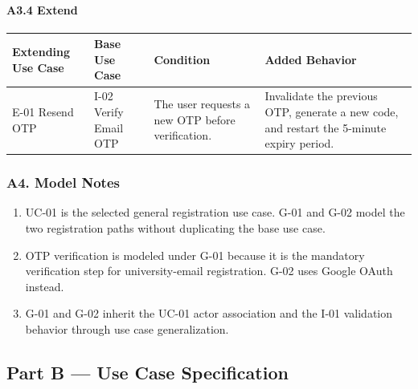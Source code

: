 \documentclass[12pt]{article}
\renewcommand{\baselinestretch}{1.5}
\begin{document}
\hypertarget{sec:a3-4-extend}{}
\paragraph*{A3.4 Extend}
\par\medskip

\begingroup
\small
\renewcommand{\baselinestretch}{1.0}\selectfont
\renewcommand{\arraystretch}{1.15}
\setlength{\tabcolsep}{6pt}
\begin{longtable}{|>{\raggedright\arraybackslash}p{}|>{\raggedright\arraybackslash}p{}|>{\raggedright\arraybackslash}p{}|>{\raggedright\arraybackslash}p{}|}
\hline
\textbf{Extending Use Case} & \textbf{Base Use Case} & \textbf{Condition} & \textbf{Added Behavior} \\ \hline
\endhead
E-01 Resend OTP & I-02 Verify Email OTP & The user requests a new OTP before verification. & Invalidate the previous OTP, generate a new code, and restart the 5-minute expiry period. \\ \hline
\end{longtable}
\endgroup
\par\medskip

\hypertarget{sec:a4-model-notes}{}
\subsubsection*{A4. Model Notes}
\par\medskip

\begin{enumerate}
\item UC-01 is the selected general registration use case. G-01 and G-02 model the two registration paths without duplicating the base use case.
\item OTP verification is modeled under G-01 because it is the mandatory verification step for university-email registration. G-02 uses Google OAuth instead.
\item G-01 and G-02 inherit the UC-01 actor association and the I-01 validation behavior through use case generalization.
\end{enumerate}
\par\medskip

\hypertarget{sec:part-b-use-case-specification}{}
\subsection*{Part B --- Use Case Specification}
\par\medskip
\end{document}
